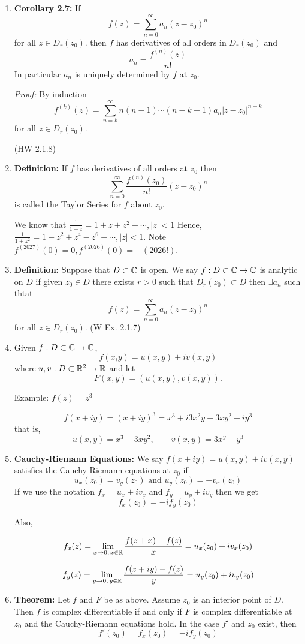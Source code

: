 \documentclass[12pt]{article}
\begin{document}
\begin{enumerate}
    \item \textbf{Corollary 2.7:} If 
    \[f(z) = \sum_{n=0}^\infty a_n (z-z_0)^n\] 
    for all $z \in D_r(z_0)$. then $f$ has derivatives of all orders in $D_r(z_0)$ and 
    \[a_n = \frac{f^{(n)}(z)}{n!}\]
    In particular $a_n$ is uniquely determined by $f$ at $z_0$. 

    \textit{Proof:} By induction 
    \[f^{(k)}(z) = \sum_{n=k}^\infty n(n-1) \cdots (n-k-1)a_n |z - z_0|^{n-k}\]
    for all $z \in D_r(z_0)$. 

    (HW 2.1.8)

    \item \textbf{Definition:} If $f$ has derivatives of all orders at $z_0$ then 
    \[\sum_{n=0}^\infty \frac{f^{(n)} (z_0)}{n!}(z-z_0)^n\]
    is called the Taylor Series for $f$ about $z_0$. 


    We know that $\frac{1}{1-z} = 1 + z + z^2 + \cdots , |z| < 1$ Hence, $\frac{1}{1+z^2} = 1 - z^2 + z^4 - z^6 + \cdots , |z| < 1$. 
    Note $f^{(2027)}(0) =0, f^{(2026)}(0) = -(2026!)$. 

    \item \textbf{Definition:} Suppose that $D \subset \mathbb C$ is open. We say $f : D \subset \mathbb C \to \mathbb C$ is analytic on $D$ if given $z_0 \in D$ there exists $r > 0$ such that $D_r(z_0) \subset D$ then $\exists a_n$ such thtat 
    \[f(z) = \sum_{n=0}^\infty a_n(z-z_0)^n\]
    for all $z \in D_r(z_0)$. (W Ex. 2.1.7)

    \item Given $f : D \subset \mathbb C \to \mathbb C$, 
    \[f(x_iy) = u(x, y) + iv(x,y)\]
    where $u, v : D \subset \mathbb R^2 \to \mathbb R$ and let 
    \[F(x,y) = (u(x,y), v(x,y)).\]

    Example: $f(z) = z^3$

    \[f(x + iy) = (x+iy)^3 = x^3 + i3x^2y - 3xy^2 - iy^3\]
    that is, 
    \[u(x,y) = x^3 - 3xy^2, \qquad v(x,y) = 3x^y - y^3\]

    \item \textbf{Cauchy-Riemann Equations:} We say $f(x+iy) = u(x,y) + iv(x,y)$ satisfies the Cauchy-Riemann equations at $z_0$ if 
    \[u_x(z_0) = v_y(z_0)  \text{ and } u_y(z_0) = -v_x(z_0)\]
    If we use the notation $f_x = u_x + iv_x$ and $f_y = u_y + iv_y$ then we get 
    \[f_x(z_0) = - if_y(z_0)\]

    Also, 

    \[f_x(z) = \lim_{x \to 0, \, x \in \mathbb R} \frac{f(z+x) - f(z)}{x} = u_x(z_0) + iv_x(z_0)\]

    \[f_y(z) = \lim_{y \to 0, \, y \in \mathbb R} \frac{f(z+iy) - f(z)}{y} = u_y(z_0) + iv_y(z_0)\]


    \item \textbf{Theorem:} Let $f$ and $F$ be as above. Assume $z_0$ is an interior point of $D$. Then $f$ is complex differentiable if and only if $F$ is complex differentiable at $z_0$ and the Cauchy-Riemann equations hold. In the case $f'$ and $z_0$ exist, then 
    \[f'(z_0) = f_x(z_0) = -if_y(z_0)\]
\end{enumerate}
\end{document}
